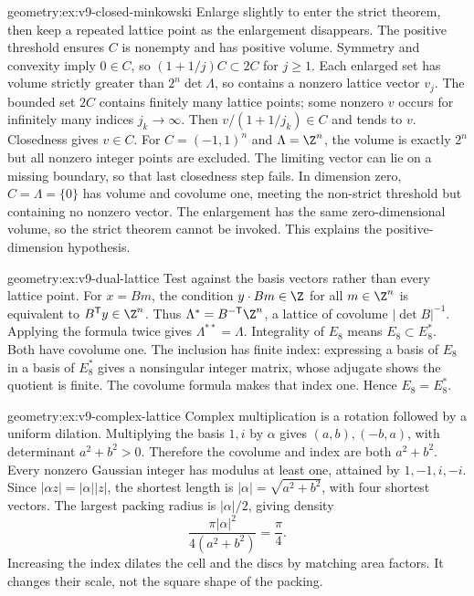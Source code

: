 \begin{solution}{geometry:ex:v9-closed-minkowski}
\idea Enlarge slightly to enter the strict theorem, then keep a repeated
lattice point as the enlargement disappears.
\writeup The positive threshold ensures $C$ is nonempty and has positive
volume. Symmetry and convexity imply $0\in C$, so
$(1+1/j)C\subset2C$ for $j\ge1$.
Each enlarged set has volume strictly greater than $2^n\det\Lambda$,
so contains a nonzero lattice vector $v_j$.
The bounded set $2C$ contains finitely many lattice points; some nonzero
$v$ occurs for infinitely many indices $j_k\to\infty$.
Then $v/(1+1/j_k)\in C$ and tends to $v$.
Closedness gives $v\in C$.
For $C=(-1,1)^n$ and $\Lambda=\Z^n$, the volume is exactly $2^n$
but all nonzero integer points are excluded. The limiting vector can lie
on a missing boundary, so that last closedness step fails.
In dimension zero, $C=\Lambda=\{0\}$ has volume and covolume one,
meeting the non-strict threshold but containing no nonzero vector.
The enlargement has the same zero-dimensional volume, so the strict
theorem cannot be invoked. This explains the positive-dimension hypothesis.
\end{solution}
\begin{solution}{geometry:ex:v9-dual-lattice}
\idea Test against the basis vectors rather than every lattice point.
\writeup For $x=Bm$, the condition $y\cdot Bm\in\Z$ for all
$m\in\Z^n$ is equivalent to $B^{\mathsf T}y\in\Z^n$.
Thus $\Lambda^*=B^{-\mathsf T}\Z^n$, a lattice of covolume
$|\det B|^{-1}$. Applying the formula twice gives $\Lambda^{**}=\Lambda$.
Integrality of $E_8$ means $E_8\subset E_8^*$.
Both have covolume one. The inclusion has finite index: expressing a
basis of $E_8$ in a basis of $E_8^*$ gives a nonsingular integer matrix,
whose adjugate shows the quotient is finite. The covolume formula makes
that index one. Hence $E_8=E_8^*$.
\end{solution}
\begin{solution}{geometry:ex:v9-complex-lattice}
\idea Complex multiplication is a rotation followed by a uniform dilation.
\writeup Multiplying the basis $1,i$ by $\alpha$ gives
$(a,b),(-b,a)$, with determinant $a^2+b^2>0$.
Therefore the covolume and index are both $a^2+b^2$.
Every nonzero Gaussian integer has modulus at least one, attained by
$1,-1,i,-i$. Since $|\alpha z|=|\alpha||z|$, the shortest length is
$|\alpha|=\sqrt{a^2+b^2}$, with four shortest vectors.
The largest packing radius is $|\alpha|/2$, giving density
\[
 \frac{\pi|\alpha|^2}{4(a^2+b^2)}=\frac\pi4.
\]
Increasing the index dilates the cell and the discs by matching area
factors. It changes their scale, not the square shape of the packing.
\end{solution}
